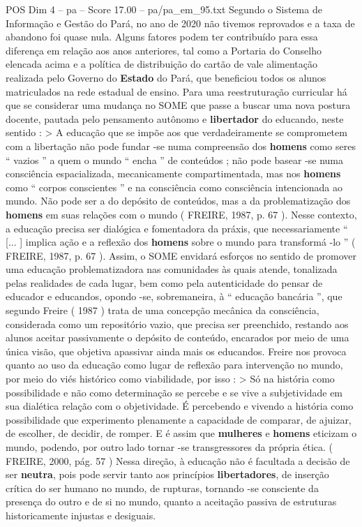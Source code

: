 \begin{textsample}{POS Dim 4 – pa – Score 17.00 – pa/pa\_em\_95.txt}
Segundo o Sistema de Informação e Gestão do Pará, no ano de 2020 não tivemos reprovados e a taxa de abandono foi quase nula.
Alguns fatores podem ter contribuído para essa diferença em relação aos anos anteriores, tal como a Portaria do Conselho elencada acima e a política de distribuição do cartão de vale alimentação realizada pelo Governo do \textbf{Estado} do Pará, que beneficiou todos os alunos matriculados na rede estadual de ensino.
Para uma reestruturação curricular há que se considerar uma mudança no SOME que passe a buscar uma nova postura docente, pautada pelo pensamento autônomo e \textbf{libertador} do educando, neste sentido : > A educação que se impõe aos que verdadeiramente se comprometem com a libertação não pode fundar -se numa compreensão dos \textbf{homens} como seres “ vazios ” a quem o mundo “ encha ” de conteúdos ; não pode basear -se numa consciência espacializada, mecanicamente compartimentada, mas nos \textbf{homens} como “ corpos conscientes ” e na consciência como consciência intencionada ao mundo.
Não pode ser a do depósito de conteúdos, mas a da problematização dos \textbf{homens} em suas relações com o mundo ( FREIRE, 1987, p. 67 ).
Nesse contexto, a educação precisa ser dialógica e fomentadora da práxis, que necessariamente “ [... ] implica ação e a reflexão dos \textbf{homens} sobre o mundo para transformá -lo ” ( FREIRE, 1987, p. 67 ).
Assim, o SOME envidará esforços no sentido de promover uma educação problematizadora nas comunidades às quais atende, tonalizada pelas realidades de cada lugar, bem como pela autenticidade do pensar de educador e educandos, opondo -se, sobremaneira, à “ educação bancária ”, que segundo Freire ( 1987 ) trata de uma concepção mecânica da consciência, considerada como um repositório vazio, que precisa ser preenchido, restando aos alunos aceitar passivamente o depósito de conteúdo, encarados por meio de uma única visão, que objetiva apassivar ainda mais os educandos.
Freire nos provoca quanto ao uso da educação como lugar de reflexão para intervenção no mundo, por meio do viés histórico como viabilidade, por isso : > Só na história como possibilidade e não como determinação se percebe e se vive a subjetividade em sua dialética relação com o objetividade.
É percebendo e vivendo a história como possibilidade que experimento plenamente a capacidade de comparar, de ajuizar, de escolher, de decidir, de romper.
E é assim que \textbf{mulheres} e \textbf{homens} eticizam o mundo, podendo, por outro lado tornar -se transgressores da própria ética. ( FREIRE, 2000, pág. 57 ) Nessa direção, à educação não é facultada a decisão de ser \textbf{neutra}, pois pode servir tanto aos princípios \textbf{libertadores}, de inserção crítica do ser humano no mundo, de rupturas, tornando -se consciente da presença do outro e de si no mundo, quanto a aceitação passiva de estruturas historicamente injustas e desiguais.

\end{textsample}
